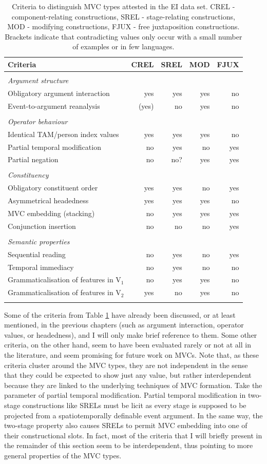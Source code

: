 \begin{table}
\begin{tabular}{lrrrr}
\lsptoprule
Criteria&CREL&SREL&MOD&FJUX\tabularnewline
\midrule
\tabularnewline
\textit{Argument structure}& & & & \tabularnewline
Obligatory argument interaction&yes&yes&yes&no\tabularnewline
Event-to-argument reanalysis&(yes)&no&yes&no\tabularnewline\tabularnewline
\textit{Operator behaviour}& & & & \tabularnewline
Identical TAM/person index values&yes&yes&yes&no\tabularnewline
Partial temporal modification&no&yes&no&yes\tabularnewline
Partial negation&no&no?&yes&yes\tabularnewline\tabularnewline
\textit{Constituency}& & & & \tabularnewline
Obligatory constituent order&yes&yes&no&yes\tabularnewline
Asymmetrical headedness&yes&yes&yes&no\tabularnewline
MVC embedding (stacking)&no&yes&yes&yes\tabularnewline
Conjunction insertion&no&no&no&yes\tabularnewline\tabularnewline
\textit{Semantic properties}& & & & \tabularnewline
Sequential reading&no&yes&no&yes\tabularnewline
Temporal immediacy&no&yes&no&no\tabularnewline
Grammaticalisation of features in V$_1$&no&yes&yes&no\tabularnewline
Grammaticalisation of features in V$_2$&yes&no&yes&no\tabularnewline
\lspbottomrule
\end{tabular}
\caption[Criteria to distinguish MVC types]{Criteria to distinguish MVC types attested in the EI data set. CREL - component-relating constructions, SREL - stage-relating constructions, MOD - modifying constructions, FJUX - free juxtaposition constructions. Brackets indicate that contradicting values only occur with a small number of examples or in few languages.}
\label{table:criteriaconstruction}
\end{table}

Some of the criteria from Table \ref{table:criteriaconstruction} have already been discussed, or at least mentioned, in the previous chapters (such as argument interaction, operator values, or headedness), and I will only make brief reference to them. Some other criteria, on the other hand, seem to have been evaluated rarely or not at all in the literature, and seem promising for future work on MVCs. Note that, as these criteria cluster around the MVC types, they are not independent in the sense that they could be expected to show just any value, but rather interdependent because they are linked to the underlying techniques of MVC formation. Take the parameter of partial temporal modification. Partial temporal modification in two-stage constructions like SRELs must be licit as every stage is supposed to be projected from a spatiotemporally definable event argument. In the same way, the two-stage property also causes SRELs to permit MVC embedding into one of their constructional slots. In fact, most of the criteria that I will briefly present in the remainder of this section seem to be interdependent, thus pointing to more general properties of the MVC types.

